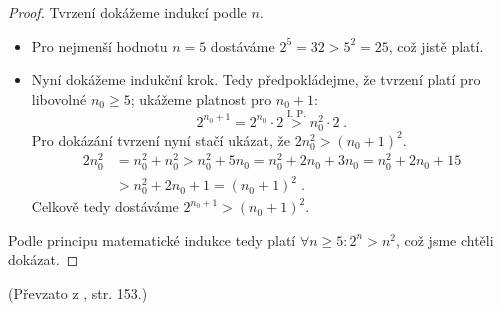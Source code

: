\begin{proof}
    Tvrzení dokážeme indukcí podle $n$.
    \begin{itemize}
        \item Pro nejmenší hodnotu $n=5$ dostáváme $2^5=32>5^2=25$, což jistě platí.
        \item Nyní dokážeme indukční krok. Tedy předpokládejme, že tvrzení platí pro libovolné $n_0\geq 5$; ukážeme platnost pro $n_0+1$:
        \begin{equation*}
            2^{n_0+1}=2^{n_0}\cdot 2\stackrel{\text{I. P.}}{>} n_0^2 \cdot 2\; .
        \end{equation*}
        Pro dokázání tvrzení nyní stačí ukázat, že $2n_0^2 > (n_0+1)^2$.
        \begin{align*}
            2n_0^2 &= n_0^2+n_0^2>n_0^2+5n_0=n_0^2+2n_0+3n_0=n_0^2+2n_0+15\\
            &>n_0^2+2n_0+1=(n_0+1)^2\; .
        \end{align*}
        Celkově tedy dostáváme $2^{n_0+1}>(n_0+1)^2$.
    \end{itemize}
    Podle principu matematické indukce tedy platí $\forall n\geq 5: 2^n>n^2$, což jsme chtěli dokázat.
\end{proof}
(Převzato z \cite{ChartrandPolimeniZhang2014}, str. 153.)

